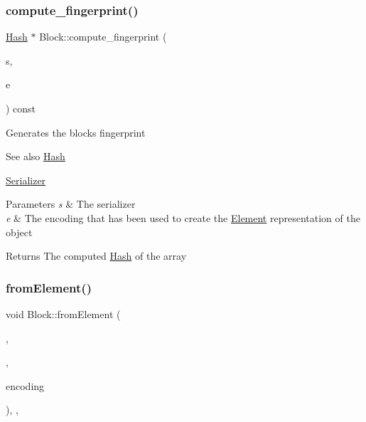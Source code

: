 \subsubsection{\texorpdfstring{compute\+\_\+fingerprint()}{compute\_fingerprint()}}
{\footnotesize\ttfamily \mbox{\hyperlink{classHash}{Hash}} $\ast$ Block\+::compute\+\_\+fingerprint (\begin{DoxyParamCaption}\item[{const \mbox{\hyperlink{classSerializer}{Serializer}} $\ast$}]{s,  }\item[{const char $\ast$}]{e }\end{DoxyParamCaption}) const}

Generates the block\textquotesingle{}s fingerprint \begin{DoxySeeAlso}{See also}
\mbox{\hyperlink{classHash}{Hash}} 

\mbox{\hyperlink{classSerializer}{Serializer}}
\end{DoxySeeAlso}

\begin{DoxyParams}{Parameters}
{\em s} & The serializer \\
\hline
{\em e} & The encoding that has been used to create the \mbox{\hyperlink{classElement}{Element}} representation of the object \\
\hline
\end{DoxyParams}
\begin{DoxyReturn}{Returns}
The computed \mbox{\hyperlink{classHash}{Hash}} of the array 
\end{DoxyReturn}
\mbox{\label{classBlock_ab21c6536cf7a26fdf2a2e889a84fcb9d}} 
\subsubsection{\texorpdfstring{from\+Element()}{fromElement()}}
{\footnotesize\ttfamily void Block\+::from\+Element (\begin{DoxyParamCaption}\item[{\mbox{\hyperlink{classElementObject}{Element\+Object}} $\ast$}]{,  }\item[{const \mbox{\hyperlink{classSerializer}{Serializer}} $\ast$}]{,  }\item[{const char $\ast$}]{encoding }\end{DoxyParamCaption})\hspace{0.3cm}{\ttfamily [override]}, {\ttfamily [protected]}, {\ttfamily [virtual]}}

